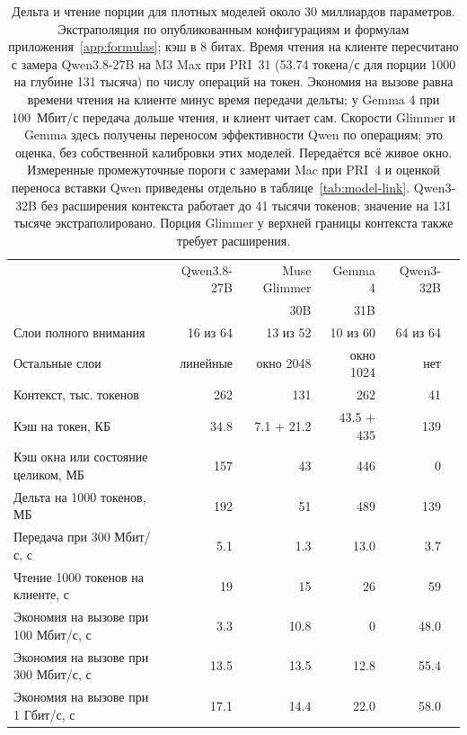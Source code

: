 \begin{table}[t]
\centering
\caption{Дельта и чтение порции для плотных моделей около 30 миллиардов параметров. Экстраполяция по опубликованным
конфигурациям и формулам приложения~\ref{app:formulas}; кэш в 8 битах. Время чтения на клиенте пересчитано с замера
Qwen3.8-27B на M3 Max при PRI~31 (53.74 токена/с для порции 1000 на глубине 131 тысяча) по числу операций на токен. Экономия на вызове
равна времени чтения на клиенте минус время передачи дельты; у Gemma 4 при 100~Мбит/с передача дольше чтения, и клиент
читает сам. Скорости Glimmer и Gemma здесь получены переносом эффективности Qwen по операциям; это оценка,
без собственной калибровки этих моделей. Передаётся всё живое окно.
Измеренные промежуточные пороги с замерами Mac при PRI~4 и оценкой переноса вставки Qwen приведены отдельно в таблице~\ref{tab:model-link}.
Qwen3-32B без расширения контекста работает до 41 тысячи токенов; значение на 131 тысяче экстраполировано.
Порция Glimmer у верхней границы контекста также требует расширения.}
\label{tab:arch-methods}
\footnotesize
\begin{tabular}{lrrrrr}
\toprule
 & Qwen3.8-27B & Muse Glimmer & Gemma 4 & Qwen3-32B \\
 &  & 30B & 31B & \\
\midrule
Слои полного внимания & 16 из 64 & 13 из 52 & 10 из 60 & 64 из 64 \\
Остальные слои & линейные & окно 2048 & окно 1024 & нет \\
Контекст, тыс. токенов & 262 & 131 & 262 & 41 \\
Кэш на токен, КБ & 34.8 & 7.1 + 21.2 & 43.5 + 435 & 139 \\
Кэш окна или состояние целиком, МБ & 157 & 43 & 446 & 0 \\
Дельта на 1000 токенов, МБ & 192 & 51 & 489 & 139 \\
Передача при 300 Мбит/с, с & 5.1 & 1.3 & 13.0 & 3.7 \\
Чтение 1000 токенов на клиенте, с & 19 & 15 & 26 & 59 \\
\midrule
Экономия на вызове при 100 Мбит/с, с & 3.3 & 10.8 & 0 & 48.0 \\
Экономия на вызове при 300 Мбит/с, с & 13.5 & 13.5 & 12.8 & 55.4 \\
Экономия на вызове при 1 Гбит/с, с & 17.1 & 14.4 & 22.0 & 58.0 \\
\bottomrule
\end{tabular}
\end{table}

